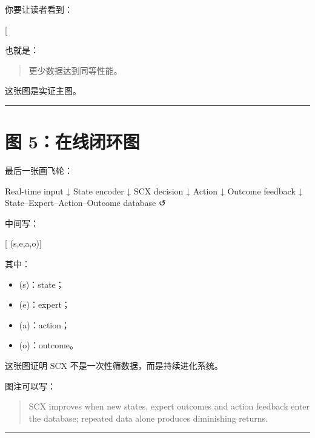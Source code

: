 \documentclass[
  12pt,
]{ctexart}
\newenvironment{Shaded}{}{}
\newcommand{\NormalTok}[1]{#1}
\providecommand{\tightlist}{%
  \setlength{\itemsep}{0pt}\setlength{\parskip}{0pt}}
\begin{document}
你要让读者看到：

{[} \text{SCX curve rises faster}{]}

也就是：

\begin{quote}
更少数据达到同等性能。
\end{quote}

这张图是实证主图。

\begin{center}\rule{0.5\linewidth}{0.5pt}\end{center}

\section{图 5：在线闭环图}\label{ux56fe-5ux5728ux7ebfux95edux73afux56fe}

最后一张画飞轮：

\begin{Shaded}
\begin{Highlighting}[]
\NormalTok{Real{-}time input}
\NormalTok{      ↓}
\NormalTok{State encoder}
\NormalTok{      ↓}
\NormalTok{SCX decision}
\NormalTok{      ↓}
\NormalTok{Action}
\NormalTok{      ↓}
\NormalTok{Outcome feedback}
\NormalTok{      ↓}
\NormalTok{State–Expert–Action–Outcome database}
\NormalTok{      ↺}
\end{Highlighting}
\end{Shaded}

中间写：

{[} (s,e,a,o){]}

其中：

\begin{itemize}
\tightlist
\item
  (s)：state；
\item
  (e)：expert；
\item
  (a)：action；
\item
  (o)：outcome。
\end{itemize}

这张图证明 SCX 不是一次性筛数据，而是持续进化系统。

图注可以写：

\begin{quote}
SCX improves when new states, expert outcomes and action feedback enter
the database; repeated data alone produces diminishing returns.
\end{quote}

\begin{center}\rule{0.5\linewidth}{0.5pt}\end{center}
\end{document}
